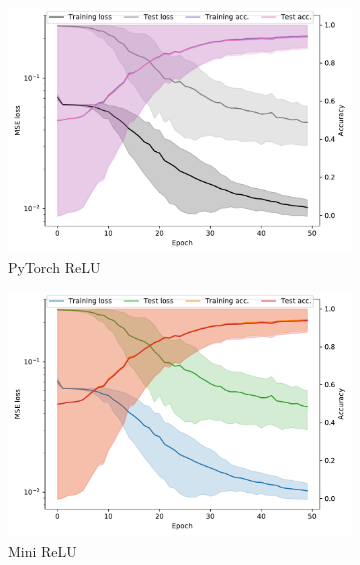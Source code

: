 \documentclass[prl, article, twocolumn]{revtex4-1}
\begin{document}
\begin{figure}[h!]
    \begin{subfigure}[]{0.45\linewidth}
        \includegraphics[width=\textwidth]{figures/pytorch/relu_history.pdf}
        \caption{PyTorch ReLU}
    \end{subfigure}
    \begin{subfigure}[]{0.45\linewidth}
        \includegraphics[width=\textwidth]{figures/mini/relu_history.pdf}
        \caption{Mini ReLU}
    \end{subfigure}
    \begin{subfigure}[]{0.45\linewidth}

\end{subfigure}
\end{figure}
\end{document}
